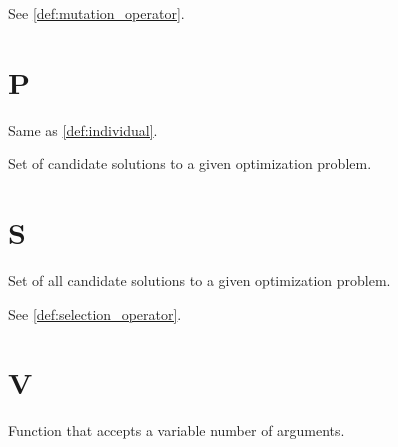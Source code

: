     \begin{definition}[Mutator]
    \label{def:mutator}
      See \vref{def:mutation_operator}.
    \end{definition}

  \section*{P}
    \begin{definition}[Phenotype]
    \label{def:phenotype}
      Same as \vref{def:individual}.
    \end{definition}

    \begin{definition}[Population]
    \label{def:population}
      Set of candidate solutions to a given optimization problem.
    \end{definition}

  \section*{S}
    \begin{definition}
    \label{def:search_space}
      Set of all candidate solutions to a given optimization problem.
    \end{definition}

    \begin{definition}[Selector]
      See \vref{def:selection_operator}.
    \end{definition}

  \section*{V}
    \begin{definition}
    \label{def:variadic_function}
      Function that accepts a variable number of arguments.  
    \end{definition}
